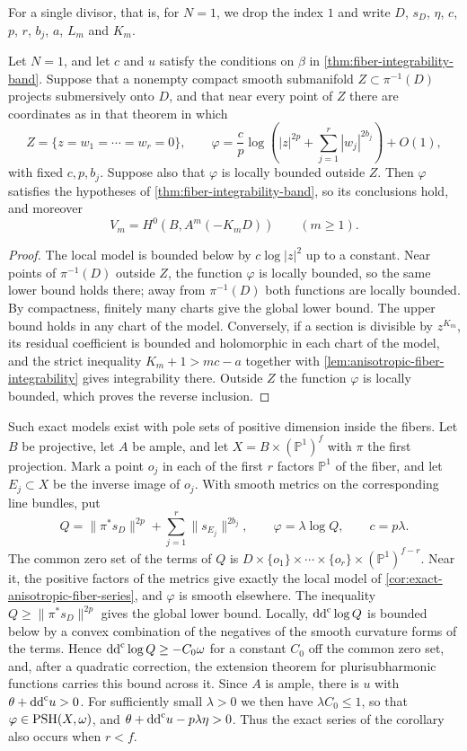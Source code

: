For a single divisor, that is, for $N=1$, we drop the index $1$ and write $D$, $s_D$, $\eta$, $c$, $p$, $r$, $b_j$, $a$, $L_m$ and $K_m$.

\begin{corollary}\label{cor:exact-anisotropic-fiber-series}
Let $N=1$, and let $c$ and $u$ satisfy the conditions on $\beta$ in \cref{thm:fiber-integrability-band}. Suppose that a nonempty compact smooth submanifold $Z\subset\pi^{-1}(D)$ projects submersively onto $D$, and that near every point of $Z$ there are coordinates as in that theorem in which
\[
 Z=\{z=w_1=\cdots=w_r=0\},\qquad
 \varphi=\frac cp\log\left(|z|^{2p}+\sum_{j=1}^r|w_j|^{2b_j}\right)+O(1),
\]
with fixed $c,p,b_j$. Suppose also that $\varphi$ is locally bounded outside $Z$. Then $\varphi$ satisfies the hypotheses of \cref{thm:fiber-integrability-band}, so its conclusions hold, and moreover
\[
 V_m=H^0(B,A^m(-K_mD))\qquad(m\geq1).
\]
\end{corollary}
\begin{proof}
The local model is bounded below by $c\log|z|^2$ up to a constant. Near points of $\pi^{-1}(D)$ outside $Z$, the function $\varphi$ is locally bounded, so the same lower bound holds there; away from $\pi^{-1}(D)$ both functions are locally bounded. By compactness, finitely many charts give the global lower bound. The upper bound holds in any chart of the model. Conversely, if a section is divisible by $z^{K_m}$, its residual coefficient is bounded and holomorphic in each chart of the model, and the strict inequality $K_m+1>mc-a$ together with \cref{lem:anisotropic-fiber-integrability} gives integrability there. Outside $Z$ the function $\varphi$ is locally bounded, which proves the reverse inclusion.
\end{proof}

Such exact models exist with pole sets of positive dimension inside the fibers. Let $B$ be projective, let $A$ be ample, and let $X=B\times(\mathbb P^1)^f$ with $\pi$ the first projection. Mark a point $o_j$ in each of the first $r$ factors $\mathbb P^1$ of the fiber, and let $E_j\subset X$ be the inverse image of $o_j$. With smooth metrics on the corresponding line bundles, put
\[
 Q=\|\pi^*s_D\|^{2p}+\sum_{j=1}^r\|s_{E_j}\|^{2b_j},
 \qquad \varphi=\lambda\log Q,\qquad c=p\lambda.
\]
The common zero set of the terms of $Q$ is $D\times\{o_1\}\times\cdots\times\{o_r\}\times(\mathbb P^1)^{f-r}$. Near it, the positive factors of the metrics give exactly the local model of \cref{cor:exact-anisotropic-fiber-series}, and $\varphi$ is smooth elsewhere. The inequality $Q\geq\|\pi^*s_D\|^{2p}$ gives the global lower bound. Locally, $\mathrm{dd}^{\mathrm{c}}\log Q$ is bounded below by a convex combination of the negatives of the smooth curvature forms of the terms. Hence $\mathrm{dd}^{\mathrm{c}}\log Q\geq-C_0\omega$ for a constant $C_0$ off the common zero set, and, after a quadratic correction, the extension theorem for plurisubharmonic functions carries this bound across it. Since $A$ is ample, there is $u$ with $\theta+\mathrm{dd}^{\mathrm{c}} u>0$. For sufficiently small $\lambda>0$ we then have $\lambda C_0\leq1$, so that $\varphi\in\mathrm{PSH}(X,\omega)$, and $\theta+\mathrm{dd}^{\mathrm{c}} u-p\lambda\eta>0$. Thus the exact series of the corollary also occurs when $r<f$.

